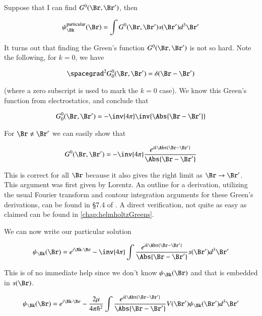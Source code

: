 Suppose that I can find $G^0(\Br, \Br')$, then

\begin{equation}\label{eqn:qmTwoL25:90}
\psi_\Bk^{\text{particular}}(\Br) = \int G^0(\Br, \Br') s(\Br') d^3 \Br'
\end{equation}

It turns out that finding the Green's function $G^0(\Br, \Br')$ is not so hard.  Note the following, for $k = 0$, we have

\begin{equation}\label{eqn:qmTwoL25:110}
\spacegrad^2 G^0_0(\Br, \Br') = \delta(\Br - \Br')
\end{equation}

(where a zero subscript is used to mark the $k = 0$ case).  We know this Green's function from electrostatics, and conclude that 

\begin{equation}\label{eqn:qmTwoL25:130}
G^0_0(\Br, \Br') = - \inv{4 \pi} \inv{\Abs{\Br - \Br'}}
\end{equation}

For $\Br \ne \Br'$ we can easily show that

\begin{equation}\label{eqn:qmTwoL25:150}
G^0(\Br, \Br') = - \inv{4 \pi} \frac{e^{i k\Abs{\Br - \Br'}}}{\Abs{\Br - \Br'}}
\end{equation}

This is correct for all $\Br$ because it also gives the right limit as $\Br \rightarrow \Br'$.  This argument was first given by Lorentz.  An outline for a derivation, utilizing the usual Fourier transform and contour integration arguments for these Green's derivations, can be found in \S 7.4 of \cite{byron1992mca}.  A direct verification, not quite as easy as claimed can be found in \ref{chap:helmholtzGreens}.

We can now write our particular solution

\begin{equation}\label{eqn:qmTwoL25:170}
\psi_\Bk(\Br) 
= e^{i \Bk \cdot \Br}
- \inv{4 \pi} \int \frac{e^{i k\Abs{\Br - \Br'}}}{\Abs{\Br - \Br'}} s(\Br') d^3 \Br'
\end{equation}

This is of no immediate help since we don't know $\psi_\Bk(\Br)$ and that is embedded in $s(\Br)$.

\begin{equation}\label{eqn:qmTwoL25:190}
\psi_\Bk(\Br) 
= e^{i \Bk \cdot \Br}
- \frac{2 \mu}{4 \pi \hbar^2} \int \frac{e^{i k\Abs{\Br - \Br'}}}{\Abs{\Br - \Br'}} V(\Br') \psi_\Bk(\Br') d^3 \Br'
\end{equation}

